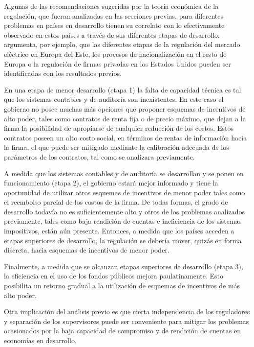 \documentclass[
  12pt,
  spanish,
]{book}
\begin{document}
Algunas de las recomendaciones sugeridas por la teoría económica de la
regulación, que fueran analizadas en las secciones previas, para
diferentes problemas en países en desarrollo tienen su correlato con lo
efectivamente observado en estos países a través de sus diferentes
etapas de desarrollo. \citet{Laffont2005} argumenta, por ejemplo, que
las diferentes etapas de la regulación del mercado eléctrico en Europa
del Este, los procesos de nacionalización en el resto de Europa o la
regulación de firmas privadas en los Estados Unidos pueden ser
identificadas con los resultados previos.

En una etapa de menor desarrollo (etapa 1) la falta de capacidad técnica
es tal que los sistemas contables y de auditoría son inexistentes. En
este caso el gobierno no posee muchas más opciones que proponer esquemas
de incentivos de alto poder, tales como contratos de renta fija o de
precio máximo, que dejan a la firma la posibilidad de apropiarse de
cualquier reducción de los costos. Estos contratos poseen un alto costo
social, en términos de rentas de información hacia la firma, el que
puede ser mitigado mediante la calibración adecuada de los parámetros de
los contratos, tal como se analizara previamente.

A medida que los sistemas contables y de auditoría se desarrollan y se
ponen en funcionamiento (etapa 2), el gobierno estará mejor informado y
tiene la oportunidad de utilizar otros esquemas de incentivos de menor
poder tales como el reembolso parcial de los costos de la firma. De
todas formas, el grado de desarrollo todavía no es suficientemente alto
y otros de los problemas analizados previamente, tales como baja
rendición de cuentas e ineficiencia de los sistemas impositivos, están
aún presente. Entonces, a medida que los países acceden a etapas
superiores de desarrollo, la regulación se debería mover, quizás en
forma discreta, hacia esquemas de incentivos de menor poder.

Finalmente, a medida que se alcanzan etapas superiores de desarrollo
(etapa 3), la eficiencia en el uso de los fondos públicos mejora
paulatinamente. Esto posibilita un retorno gradual a la utilización de
esquemas de incentivos de más alto poder.

Otra implicación del análisis previo es que cierta independencia de los
reguladores y separación de los supervisores puede ser conveniente para
mitigar los problemas ocasionados por la baja capacidad de compromiso y
de rendición de cuentas en economías en desarrollo.
\end{document}
